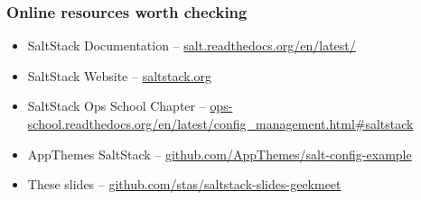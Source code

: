 \documentclass[compress]{beamer}
\begin{document}
\begin{frame}
\frametitle{Online resources worth checking}

\begin{itemize}
  \item SaltStack Documentation -- \href{http://salt.readthedocs.org/en/latest/}{salt.readthedocs.org/en/latest/}
  \item SaltStack Website -- \href{http://saltstack.com/about.html}{saltstack.org}
  \item SaltStack Ops School Chapter -- \href{http://ops-school.readthedocs.org/en/latest/config\_management.html\#saltstack}{ops-school.readthedocs.org/en/latest/config\_management.html\#saltstack}
  \item AppThemes SaltStack -- \href{https://github.com/AppThemes/salt-config-example}{github.com/AppThemes/salt-config-example}
  \item These slides -- \href{https://github.com/stas/saltstack-slides-geekmeet}{github.com/stas/saltstack-slides-geekmeet}
\end{itemize}

\end{frame}
\end{document}
